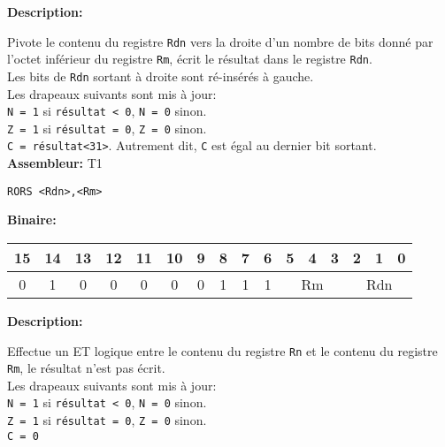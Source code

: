 \documentclass{article}
\begin{document}

    \textbf{Description: }

    Pivote le contenu du registre \texttt{Rdn} vers la droite d'un nombre de bits donné par l'octet inférieur du registre \texttt{Rm}, écrit le résultat dans le registre \texttt{Rdn}.\\
    Les bits de \texttt{Rdn} sortant à droite sont ré-insérés à gauche.\\
    Les drapeaux suivants sont mis à jour:\\
    \texttt{N = 1} si \texttt{résultat < 0}, \texttt{N = 0} sinon.\\
    \texttt{Z = 1} si \texttt{résultat = 0}, \texttt{Z = 0} sinon.\\
    \texttt{C = résultat<31>}.
    Autrement dit, \texttt{C} est égal au dernier bit sortant.\\

    \textbf{Assembleur:} T1

    \begin{lstlisting}
RORS <Rdn>,<Rm>
    \end{lstlisting}

    \textbf{Binaire:}

    \begin{tabular}{| c c c c c c c c c c c c c c c c |}
        \hline
        15 & 14 & 13 & 12 & 11 & 10 & \multicolumn{1}{|c}{9} & 8 & 7 & 6 & \multicolumn{1}{|c}{5} & 4 & 3 & \multicolumn{1}{|c}{2} & 1 & 0 \\
        \hline
        0 & 1 & 0 & 0 & 0 & 0 & \multicolumn{1}{|c}{0} & 1 & 1 & 1 & \multicolumn{3}{|c}{Rm} & \multicolumn{3}{|c|}{Rdn} \\
        \hline
    \end{tabular}



    \textbf{Description: }

    Effectue un ET logique entre le contenu du registre \texttt{Rn} et le contenu du registre \texttt{Rm}, le résultat n'est pas écrit.\\
    Les drapeaux suivants sont mis à jour:\\
    \texttt{N = 1} si \texttt{résultat < 0}, \texttt{N = 0} sinon.\\
    \texttt{Z = 1} si \texttt{résultat = 0}, \texttt{Z = 0} sinon.\\
    \texttt{C = 0}\\
\end{document}
